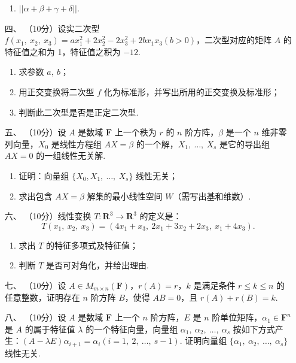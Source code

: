 \begin{enumerate}
\begin{enumerate}[label=(\arabic*)]
        \item $||\alpha+\beta+\gamma+\delta||$.
    \end{enumerate}
	\item[四、]（10分）设实二次型 $f(x_1,\ x_2,\ x_3)=ax_1^2+2x_2^2-2x_3^2+2bx_1x_3(b > 0)$，二次型对应的矩阵 $A$ 的特征值之和为 1，特征值之积为 $-12$.
    \begin{enumerate}[label=(\arabic*)]
        \item 求参数 $a,\ b$；

        \item 用正交变换将二次型 $f$ 化为标准形，并写出所用的正交变换及标准形；

        \item 判断此二次型是否是正定二次型.
    \end{enumerate}
	\item[五、]（10分）设 $A$ 是数域 $\mathbf{F}$ 上一个秩为 $r$ 的 $n$ 阶方阵，$\beta$ 是一个 $n$ 维非零列向量，$X_0$ 是线性方程组 $AX=\beta$ 的一个解，$X_1,\ \dots,\ X_s$ 是它的导出组 $AX=0$ 的一组线性无关解.
    \begin{enumerate}
        \item 证明：向量组 $\{X_0, X_1,\ \dots,\ X_s\}$ 线性无关；

        \item 求出包含 $AX=\beta$ 解集的最小线性空间 $W$（需写出基和维数）.
    \end{enumerate}
	\item[六、]（10分）线性变换 $T : \mathbf{R}^3 \to \mathbf{R}^3$ 的定义是：
    \[T(x_1,\ x_2,\ x_3)=(4x_1+x_3,\ 2x_1+3x_2+2x_3,\ x_1+4x_3).\]
    \begin{enumerate}[label=(\arabic*)]
        \item 求出 $T$ 的特征多项式及特征值；

        \item 判断 $T$ 是否可对角化，并给出理由.
    \end{enumerate}
	\item[七、]（10分）设 $A \in M_{m \times n}(\mathbf{F})$，$r(A)=r$，$k$ 是满足条件 $r \leqslant k \leqslant n$ 的任意整数，证明存在 $n$ 阶方阵 $B$，使得 $AB=0$，且 $r(A)+r(B)=k$.

    \item[八、]（10分）设 $A$ 是数域 $\mathbf{F}$ 上一个 $n$ 阶方阵，$E$ 是 $n$ 阶单位矩阵，$\alpha_1 \in \mathbf{F}^n$ 是 $A$ 的属于特征值 $\lambda$ 的一个特征向量，向量组 $\alpha_1,\ \alpha_2,\ \dots,\ \alpha_s$ 按如下方式产生：$(A-\lambda E)\alpha_{i+1}=\alpha_i(i=1,\ 2,\ \dots,\ s-1)$. 证明向量组 $\{\alpha_1,\ \alpha_2,\ \dots,\ \alpha_s\}$ 线性无关.


\end{enumerate}
